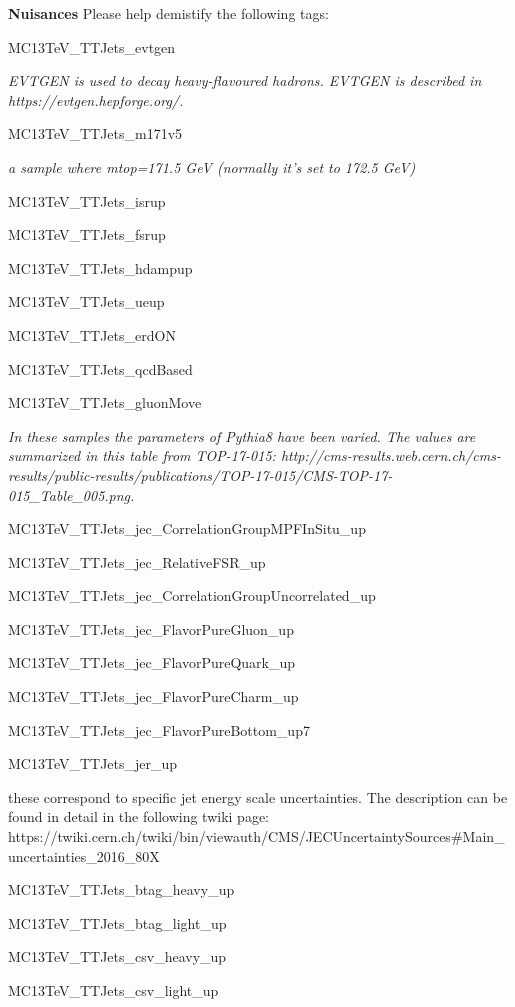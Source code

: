 \documentclass{article}
\begin{document}
\textbf{Nuisances}
Please help demistify the following tags:
\begin{itemize}
\item MC13TeV\_TTJets\_evtgen

{\it EVTGEN is used to decay heavy-flavoured hadrons. EVTGEN is described in https://evtgen.hepforge.org/.}

\item MC13TeV\_TTJets\_m171v5

{\it a \ttbar sample where mtop=171.5 GeV (normally it's set to 172.5 GeV)}

\item MC13TeV\_TTJets\_isrup
\item MC13TeV\_TTJets\_fsrup
\item MC13TeV\_TTJets\_hdampup
\item MC13TeV\_TTJets\_ueup
\item MC13TeV\_TTJets\_erdON
\item MC13TeV\_TTJets\_qcdBased
\item MC13TeV\_TTJets\_gluonMove

{\it In these samples the parameters of Pythia8 have been varied.
The values are summarized in this table from TOP-17-015:
http://cms-results.web.cern.ch/cms-results/public-results/publications/TOP-17-015/CMS-TOP-17-015_Table_005.png.}

\item MC13TeV\_TTJets\_jec\_CorrelationGroupMPFInSitu\_up
\item MC13TeV\_TTJets\_jec\_RelativeFSR\_up
\item MC13TeV\_TTJets\_jec\_CorrelationGroupUncorrelated\_up
\item MC13TeV\_TTJets\_jec\_FlavorPureGluon\_up
\item MC13TeV\_TTJets\_jec\_FlavorPureQuark\_up
\item MC13TeV\_TTJets\_jec\_FlavorPureCharm\_up
\item MC13TeV\_TTJets\_jec\_FlavorPureBottom\_up7
\item MC13TeV\_TTJets\_jer\_up

{\item these correspond to specific jet energy scale uncertainties. The description can be found in detail in the following twiki page:
https://twiki.cern.ch/twiki/bin/viewauth/CMS/JECUncertaintySources#Main_uncertainties_2016_80X
}

\item MC13TeV\_TTJets\_btag\_heavy\_up
\item MC13TeV\_TTJets\_btag\_light\_up
\item MC13TeV\_TTJets\_csv\_heavy\_up
\item MC13TeV\_TTJets\_csv\_light\_up



\end{itemize}
\end{document}
